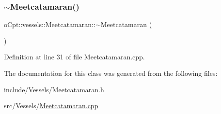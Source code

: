 \subsubsection{\texorpdfstring{$\sim$\+Meetcatamaran()}{~Meetcatamaran()}}
{\footnotesize\ttfamily o\+Cpt\+::vessels\+::\+Meetcatamaran\+::$\sim$\+Meetcatamaran (\begin{DoxyParamCaption}{ }\end{DoxyParamCaption})\hspace{0.3cm}{\ttfamily [virtual]}}



Definition at line 31 of file Meetcatamaran.\+cpp.



The documentation for this class was generated from the following files\+:\begin{DoxyCompactItemize}
\item 
include/\+Vessels/\hyperlink{_meetcatamaran_8h}{Meetcatamaran.\+h}\item 
src/\+Vessels/\hyperlink{_meetcatamaran_8cpp}{Meetcatamaran.\+cpp}\end{DoxyCompactItemize}

